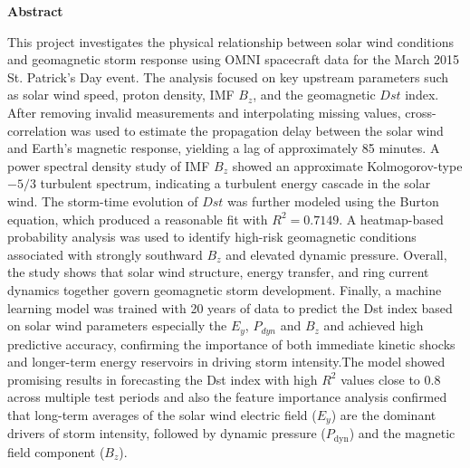 \documentclass[12pt]{article}
\begin{document}
\begin{titlepage}
    \vspace*{\fill} %
    
    \begin{center}
        \Large \textbf{Abstract} %
    \end{center}
    
    \vspace{0.5cm} 


    This project investigates the physical relationship between solar wind conditions and geomagnetic storm response using OMNI spacecraft data for the March 2015 St. Patrick’s Day event. The analysis focused on key upstream parameters such as solar wind speed, proton density, IMF $B_z$, and the geomagnetic $Dst$ index. After removing invalid measurements and interpolating missing values, cross-correlation was used to estimate the propagation delay between the solar wind and Earth's magnetic response, yielding a lag of approximately 85 minutes. A power spectral density study of IMF $B_z$ showed an approximate Kolmogorov-type $-5/3$ turbulent spectrum, indicating a turbulent energy cascade in the solar wind. The storm-time evolution of $Dst$ was further modeled using the Burton equation, which produced a reasonable fit with $R^2 = 0.7149$. A heatmap-based probability analysis was used to identify high-risk geomagnetic conditions associated with strongly southward $B_z$ and elevated dynamic pressure. Overall, the study shows that solar wind structure, energy transfer, and ring current dynamics together govern geomagnetic storm development. Finally, a machine learning model was trained with 20 years of data to predict the Dst index based on solar wind parameters especially the $E_y$, $P_{dyn}$ and $B_z$ and achieved high predictive accuracy, confirming the importance of both immediate kinetic shocks and longer-term energy reservoirs in driving storm intensity.The model showed promising results in forecasting the Dst index with high $R^2$ values close to 0.8 across multiple test periods and also the feature importance analysis confirmed that long-term averages of the solar wind electric field ($E_y$) are the dominant drivers of storm intensity, followed by dynamic pressure ($P_{\mathrm{dyn}}$) and the magnetic field component ($B_z$).

    
    \vspace*{\fill} %
\end{titlepage}
\end{document}
